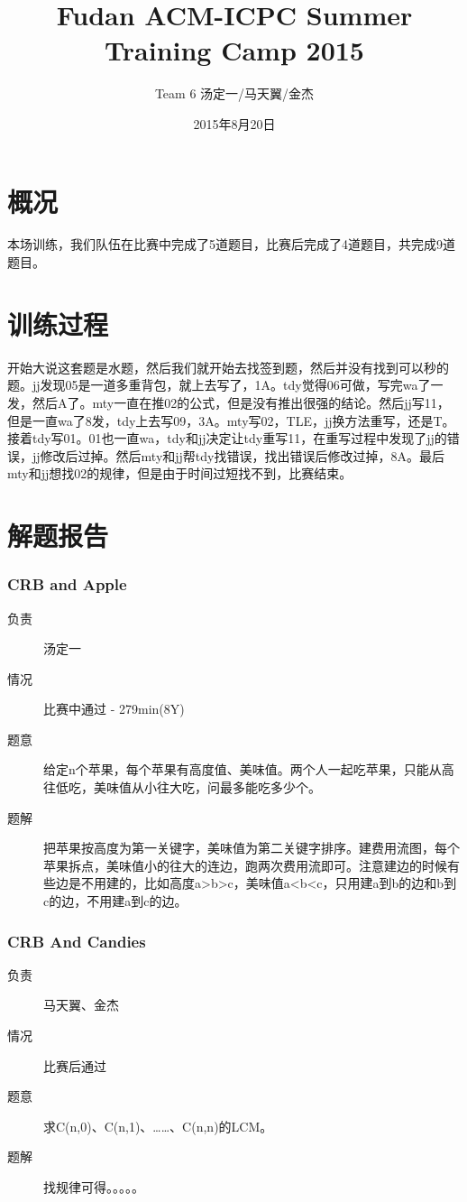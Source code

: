 \documentclass[a4paper, 11pt, nofonts, nocap, fancyhdr]{ctexart}
\title{Fudan ACM-ICPC Summer Training Camp 2015}
\author{Team 6 汤定一/马天翼/金杰}
\date{2015年8月20日}
\newcommand{\problem}[1]{\subsubsection{#1}}
\begin{document}
\maketitle

\section{概况}

本场训练，我们队伍在比赛中完成了5道题目，比赛后完成了4道题目，共完成9道题目。

\section{训练过程}

开始大说这套题是水题，然后我们就开始去找签到题，然后并没有找到可以秒的题。jj发现05是一道多重背包，就上去写了，1A。tdy觉得06可做，写完wa了一发，然后A了。mty一直在推02的公式，但是没有推出很强的结论。然后jj写11，但是一直wa了8发，tdy上去写09，3A。mty写02，TLE，jj换方法重写，还是T。接着tdy写01。01也一直wa，tdy和jj决定让tdy重写11，在重写过程中发现了jj的错误，jj修改后过掉。然后mty和jj帮tdy找错误，找出错误后修改过掉，8A。最后mty和jj想找02的规律，但是由于时间过短找不到，比赛结束。

\section{解题报告}

\problem{CRB and Apple}%

\begin{description}
\item[负责] 汤定一
\item[情况] 比赛中通过 - 279min(8Y)
\item[题意]
给定n个苹果，每个苹果有高度值、美味值。两个人一起吃苹果，只能从高往低吃，美味值从小往大吃，问最多能吃多少个。
\item[题解]
把苹果按高度为第一关键字，美味值为第二关键字排序。建费用流图，每个苹果拆点，美味值小的往大的连边，跑两次费用流即可。注意建边的时候有些边是不用建的，比如高度a>b>c，美味值a<b<c，只用建a到b的边和b到c的边，不用建a到c的边。
\end{description}

\problem{CRB And Candies}

\begin{description}
\item[负责] 马天翼、金杰
\item[情况] 比赛后通过
\item[题意]
求C(n,0)、C(n,1)、……、C(n,n)的LCM。
\item[题解]
找规律可得。。。。。
\end{description}
\end{document}
